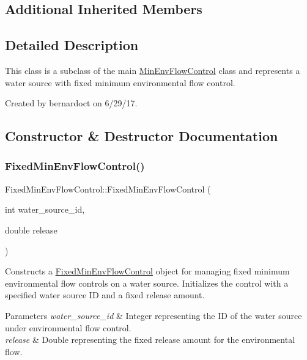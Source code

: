 \subsection*{Additional Inherited Members}


\subsection{Detailed Description}
This class is a subclass of the main {\ttfamily \mbox{\hyperlink{classMinEnvFlowControl}{Min\+Env\+Flow\+Control}}} class and represents a water source with fixed minimum environmental flow control. 

Created by bernardoct on 6/29/17. 

\subsection{Constructor \& Destructor Documentation}
\mbox{\label{classFixedMinEnvFlowControl_ab03711220b87d6490a4c2ca81fcc89a0}} 
\subsubsection{\texorpdfstring{Fixed\+Min\+Env\+Flow\+Control()}{FixedMinEnvFlowControl()}\hspace{0.1cm}{\footnotesize\ttfamily [1/2]}}
{\footnotesize\ttfamily Fixed\+Min\+Env\+Flow\+Control\+::\+Fixed\+Min\+Env\+Flow\+Control (\begin{DoxyParamCaption}\item[{int}]{water\+\_\+source\+\_\+id,  }\item[{double}]{release }\end{DoxyParamCaption})}



Constructs a {\ttfamily \mbox{\hyperlink{classFixedMinEnvFlowControl}{Fixed\+Min\+Env\+Flow\+Control}}} object for managing fixed minimum environmental flow controls on a water source. Initializes the control with a specified water source ID and a fixed release amount. 


\begin{DoxyParams}{Parameters}
{\em water\+\_\+source\+\_\+id} & Integer representing the ID of the water source under environmental flow control. \\
\hline
{\em release} & Double representing the fixed release amount for the environmental flow. \\
\hline
\end{DoxyParams}
\mbox{\label{classFixedMinEnvFlowControl_a57795231f747cae4a4b5b4cf9d4d044f}} 
